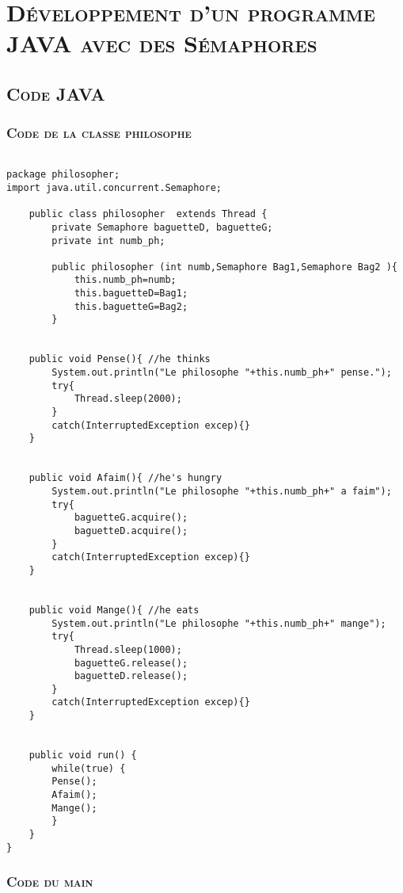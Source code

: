 \chapter{\textsc{Développement d'un programme JAVA avec des Sémaphores}}
\section{\textsc{Code JAVA}}

\subsection{\textsc{Code de la classe philosophe}}
	\begin{lstlisting}
		
package philosopher;
import java.util.concurrent.Semaphore;

	public class philosopher  extends Thread {
		private Semaphore baguetteD, baguetteG;
		private int numb_ph;
	
		public philosopher (int numb,Semaphore Bag1,Semaphore Bag2 ){
			this.numb_ph=numb;
			this.baguetteD=Bag1;
			this.baguetteG=Bag2;
		}
	
	
	public void Pense(){ //he thinks
		System.out.println("Le philosophe "+this.numb_ph+" pense.");
		try{
			Thread.sleep(2000);
		}
		catch(InterruptedException excep){}
	}

	
	public void Afaim(){ //he's hungry
		System.out.println("Le philosophe "+this.numb_ph+" a faim");
		try{
			baguetteG.acquire();
			baguetteD.acquire();
		}
		catch(InterruptedException excep){}
	}
	
	
	public void Mange(){ //he eats
		System.out.println("Le philosophe "+this.numb_ph+" mange");
		try{
			Thread.sleep(1000);
			baguetteG.release();
			baguetteD.release();
		}
		catch(InterruptedException excep){}
	}
	
	
	public void run() {
		while(true) {
		Pense();
		Afaim();
		Mange();
		}
	}
}

	\end{lstlisting}


\subsection{\textsc{Code du main}}

